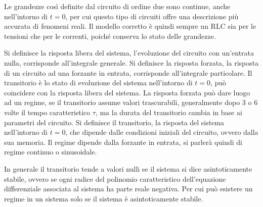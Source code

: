 \documentclass{article}
\numberwithin{equation}{subsection}
\begin{document}
Le grandezze così definite dal circuito di ordine due sono continue, anche nell'intorno di $t=0$, per cui questo tipo di circuiti offre una descrizione più accurata di 
fenomeni reali. Il modello corretto è quindi sempre un RLC sia per le tensioni che per le correnti, poiché conserva lo stato delle grandezze. 

Si definisce la risposta libera del sistema, l'evoluzione del circuito con un'entrata nulla, corrisponde all'integrale generale.  
Si definisce la risposta forzata, la risposta di un circuito ad una forzante in entrata, corrisponde all'integrale particolare. 
Il transitorio è lo stato di evoluzione del sistema nell'intorno di $t=0$, può coincidere con la risposta libera del sistema. 
La risposta forzata può dare luogo ad un regime, se il transitorio assume valori trascurabili, generalmente dopo $3$ o $6$ volte il tempo caratteristico $\tau$, 
ma la durata del transitorio cambia in base ai parametri del circuito. 
Si definisce il transitorio, la risposta del sistema nell'intorno di $t=0$, che 
dipende dalle condizioni iniziali del circuito, ovvero dalla sua memoria. Il regime dipende dalla forzante in entrata, si parlerà quindi di regime continuo o sinusoidale. 

In generale il transitorio tende a valori nulli se il sistema si dice asintoticamente stabile, ovvero se ogni radice del polinomio caratteristico dell'equazione 
differenziale associata al sistema ha parte reale negativa. Per cui può esistere un regime in un sistema solo se il sistema è asintoticamente stabile. 
\end{document}
